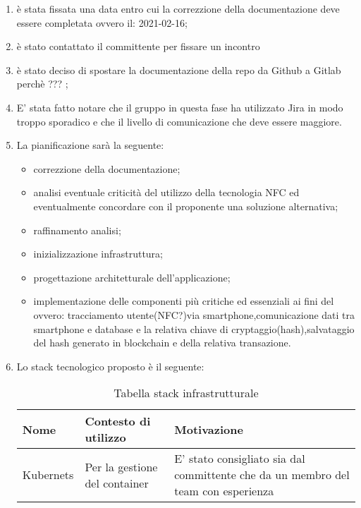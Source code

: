 \begin{enumerate}
    \item è stata fissata una data entro cui la correzzione della documentazione deve essere completata ovvero il: 2021-02-16;
    \item è stato contattato il committente per fissare un incontro
    \item è stato deciso di spostare la documentazione della repo da Github a Gitlab perchè ???   ;
    \item E' stata fatto notare che il gruppo in questa fase ha utilizzato Jira in modo troppo sporadico e che il livello di 
    comunicazione che deve essere maggiore.
    \item La pianificazione sarà la seguente:
    \begin{itemize}
    \item correzzione della documentazione;
    \item analisi eventuale criticità del utilizzo della tecnologia NFC ed eventualmente concordare con il proponente una soluzione alternativa;
    \item raffinamento analisi;
    \item inizializzazione infrastruttura;
    \item progettazione architetturale dell'applicazione;
    \item implementazione delle componenti più critiche ed essenziali ai fini del  ovvero:
        tracciamento utente(NFC?)via smartphone,comunicazione dati tra smartphone e database e la relativa chiave di cryptaggio(hash),salvataggio del hash generato in blockchain e della relativa transazione.
    \end{itemize}
    \item Lo stack tecnologico proposto è il seguente:\\
	\renewcommand{\arraystretch}{2}
    \begin{longtable}{ C{5cm} C{4cm} C{5cm} }
        \caption{Tabella stack infrastrutturale}                                                                                 \\
        \rowcolor{\primaryColor}
        \textcolor{\secondaryColor}{\textbf{Nome}} & \textcolor{\secondaryColor}{\textbf{Contesto di utilizzo}} & \textcolor{\secondaryColor}{\textbf{Motivazione}}\\ \endhead
        {Kubernets} & {Per la gestione del container}   & {E' stato consigliato sia dal committente che da un membro del team con esperienza}\\
    \end{longtable}


\end{enumerate}

